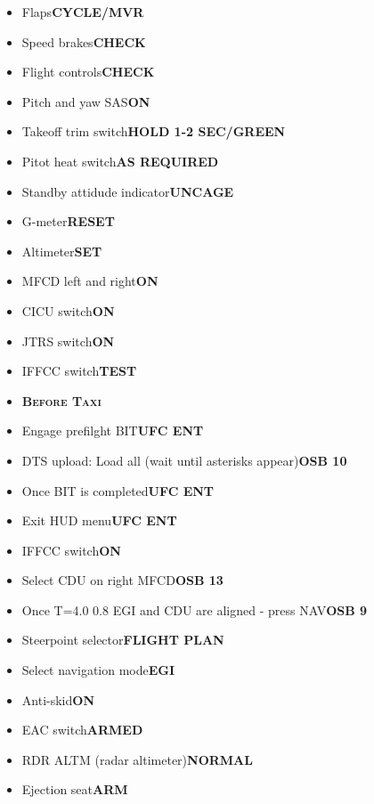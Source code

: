 \documentclass[a4paper,12pt,dvipsnames]{letter}
\newcommand{\button}[1]{\textbf{#1}}
\newcommand{\myHead}[1]{{\LARGE\textsc{\textbf{#1}}}}
\begin{document}
{\begin{itemize}
 \item Flaps\dotfill\button{CYCLE/MVR}
 \item Speed brakes\dotfill\button{CHECK}
 \item Flight controls\dotfill\button{CHECK}
 \item Pitch and yaw SAS\dotfill\button{ON}
 \item Takeoff trim switch\dotfill\button{HOLD 1-2 SEC/GREEN}
 \item Pitot heat switch\dotfill\button{AS REQUIRED}
 \item Standby attidude indicator\dotfill\button{UNCAGE}
 \item G-meter\dotfill\button{RESET}
 \item Altimeter\dotfill\button{SET}
 \item MFCD left and right\dotfill\button{ON}
 \item CICU switch\dotfill\button{ON}
 \item JTRS switch\dotfill\button{ON}
 \item IFFCC switch\dotfill\button{TEST}
\end{itemize}
\newpage
\begin{itemize}
 \item[] \myHead{Before Taxi}
 \item Engage prefilght BIT\dotfill\button{UFC ENT}
 \item DTS upload: Load all (wait until asterisks appear)\dotfill\button{OSB 10}
 \item Once BIT is completed\dotfill\button{UFC ENT}
 \item Exit HUD menu\dotfill\button{UFC ENT}
 \item IFFCC switch\dotfill\button{ON}
 \item Select CDU on right MFCD\dotfill\button{OSB 13}
 \item Once T=4.0 0.8 EGI and CDU are aligned - press NAV\dotfill\button{OSB 9}
 \item Steerpoint selector\dotfill\button{FLIGHT PLAN}
 \item Select navigation mode\dotfill\button{EGI}
 \item Anti-skid\dotfill\button{ON}
 \item EAC switch\dotfill\button{ARMED}
 \item RDR ALTM (radar altimeter)\dotfill\button{NORMAL}
 \item Ejection seat\dotfill\button{ARM}

\end{itemize}}
\end{document}
